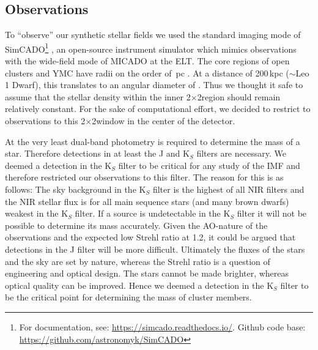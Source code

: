 
\subsection{Observations}
\label{sec:telescope}

To ``observe'' our synthetic stellar fields we used the standard imaging mode of SimCADO\footnote{For documentation, see: \url{https://simcado.readthedocs.io/}. Github code base: \url{https://github.com/astronomyk/SimCADO}} \citep{leschinski2016}, an open-source instrument simulator which mimics observations with the wide-field mode of MICADO at the ELT. 
The core regions of open clusters and YMC have radii on the order of \,pc \citep{portegies2010}. 
At a distance of 200\,kpc ($\sim$Leo 1 Dwarf), this translates to an angular diameter of \arcsec. Thus we thought it safe to assume that the stellar density within the inner 2\arcsec$\times$2\arcsec region should remain relatively constant.
For the sake of computational effort, we decided to restrict to observations to this 2\arcsec$\times$2\arcsec window in the center of the detector.

At the very least dual-band photometry is required to determine the mass of a star. Therefore detections in at least the J and K$_S$ filters are necessary. 
We deemed a detection in the K$_S$ filter to be critical for any study of the IMF and therefore restricted our observations to this filter. 
The reason for this is as follows: The sky background in the K$_S$ filter is the highest of all NIR filters and the NIR stellar flux is for all main sequence stars (and many brown dwarfs) weakest in the K$_S$ filter. 
If a source is undetectable in the K$_S$ filter it will not be possible to determine its mass accurately. Given the AO-nature of the observations and the expected low Strehl ratio at 1.2\um \citep{clenet2016}, it could be argued that detections in the J filter will be more difficult. 
Ultimately the fluxes of the stars and the sky are set by nature, whereas the Strehl ratio is a question of engineering and optical design. 
The stars cannot be made brighter, whereas optical quality can be improved. 
Hence we deemed a detection in the K$_S$ filter to be the critical point for determining the mass of cluster members.

